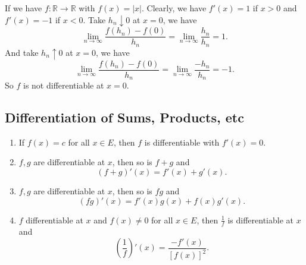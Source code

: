 \begin{example}
    If we have \(f: \mathbb{R}\to \mathbb{R}\) with \(f(x) = \left\vert x \right\vert \). Clearly, we have
    \(f'(x) = 1\) if \(x > 0\) and \(f'(x) = -1\) if \(x < 0\). Take \(h_n \downarrow 0\) at \(x = 0\), we have
    \[
        \lim\limits_{n \to \infty} \frac{f(h_n) - f(0)}{h_n} = \lim\limits_{n \to \infty} \frac{h_n}{h_n} = 1.
    \]
    And take \(h_n \uparrow 0\) at \(x = 0\), we have
    \[
        \lim\limits_{n \to \infty} \frac{f(h_n) - f(0)}{h_n} = \lim\limits_{n \to \infty} \frac{-h_n}{h_n} = -1.
    \]
    So \(f\) is not differentiable at \(x = 0\).
\end{example}
\subsection{Differentiation of Sums, Products, etc}
\begin{property}
\leavevmode
\begin{enumerate}
    \item If \(f(x) = c\) for all \(x \in E\), then \(f\) is differentiable with \(f'(x) = 0\).
    \item \(f, g\) are differentiable at \(x\), then so is \(f + g\) and
    \[
        (f+g)'(x) = f'(x) + g'(x).
    \]
    \item \(f,g\) are differentiable at \(x\), then so is \(fg\) and
    \[
        (fg)'(x) = f'(x)g(x) + f(x)g'(x).
    \]
    \item \(f\) differentiable at \(x\) and \(f(x) \neq 0\) for all \(x \in E\), then \(\frac{1}{f}\) is differentiable at \(x\) and
    \[
        (\frac{1}{f})'(x) = \frac{-f'(x)}{[f(x)]^2}.
    \]
\end{enumerate}
\end{property}
